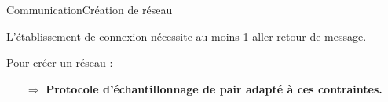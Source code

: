 \begin{frame}{Communication}{Création de réseau}

  \begin{minipage}{0.37\textwidth}
    L'établissement de connexion nécessite au moins 1 aller-retour de message.
  \end{minipage}
  \begin{minipage}{0.61\textwidth}
    \begin{center}
    
    \end{center}
  \end{minipage}

  \vspace{0.5cm}

  \begin{minipage}{0.6\textwidth}
    Pour créer un réseau : 
    \begin{itemize}
    \end{itemize}
  \end{minipage}
  \begin{minipage}{0.3\textwidth}
    \begin{center}
      
    \end{center}
  \end{minipage}
  
  
  \vspace{0.5cm}
  
  \large
  \begin{itemize}
  \item [$\Rightarrow$] \textbf{Protocole d'échantillonnage de pair adapté à ces
      contraintes.}
  \end{itemize}
  
\end{frame}


